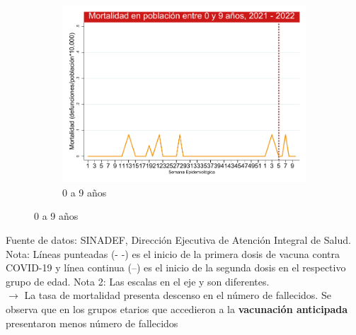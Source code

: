 \documentclass[xcolor=table]{beamer}
\begin{document}
\begin{frame}
\begin{figure}
\begin{subfigure}[b]{0.3\textwidth}
			\includegraphics[width=\textwidth]{../figuras/mortalidad_edad_0.pdf}
			\caption{0 a 9 años}
		\end{subfigure}
		\vspace{10mm}	
	\end{figure}
	\vspace{-.8cm} 
	{\tiny Fuente de datos: SINADEF, Dirección Ejecutiva de Atención Integral de Salud.\\}
	{\tiny Nota: Líneas punteadas (- -) es el inicio de la primera dosis de vacuna contra COVID-19 y línea continua (--) es el inicio de la segunda dosis en el respectivo grupo de edad. Nota 2: Las escalas en el eje y son diferentes.\\}
	$\rightarrow$ {\small La tasa de mortalidad presenta descenso en el número de fallecidos. Se observa que en los grupos etarios que accedieron a la \textbf{\color{mycolor3}vacunación anticipada} presentaron menos número de fallecidos}  \hyperlink{indice}{}
\end{frame}
\end{document}
